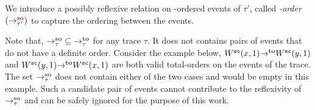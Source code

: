We introduce a possibly reflexive relation on \sc-ordered
events of $\tau'$, called {\em \sc-order} $(\so{\tau'}{}{})$ to 
capture the ordering between the \sc events. 
%
%
Note that, $\setSO \subseteq \setTO$ for any trace $\tau$. It
does not contains pairs of \sc events that do not have a definite
order. Consider the example below, $\to{}{W^\sc(x,1)}{W^\sc(y,1)}$
and $\to{}{W^\sc(y,1)}{W^\sc(x,1)}$ are both valid total-orders
on the \sc events of the trace.
%
The set $\setSO$ does not contain either of the two cases and 
would be empty in this example.
%
Such a candidate pair of events cannot contribute to the 
reflexivity of $\setSO$ and can be safely ignored for the
purpose of this work. 
\begin{figure}[h]
	\resizebox{0.29\textwidth}{!}{}
\end{figure}